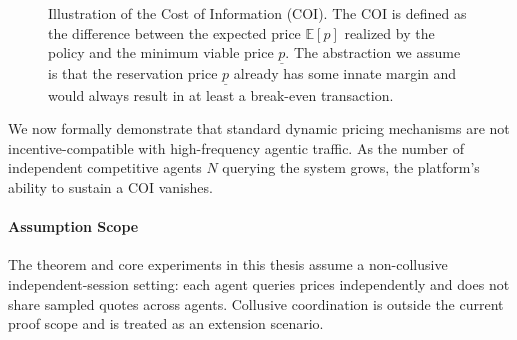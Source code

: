 \begin{figure}[ht]
    \centering
    \caption{Illustration of the Cost of Information (COI). The COI is defined as the difference between the expected price $\mathbb{E}[p]$ realized by the policy and the minimum viable price $\underline{p}$. The abstraction we assume is that the reservation price $\underline{p}$ already has some innate margin and would always result in at least a break-even transaction.}
    \label{fig:coi_illustration}
\end{figure}

We now formally demonstrate that standard dynamic pricing mechanisms are not incentive-compatible with high-frequency agentic traffic. As the number of independent competitive agents $N$ querying the system grows, the platform's ability to sustain a COI vanishes.

\paragraph{Assumption Scope}
The theorem and core experiments in this thesis assume a non-collusive independent-session setting: each agent queries prices independently and does not share sampled quotes across agents. Collusive coordination is outside the current proof scope and is treated as an extension scenario.

